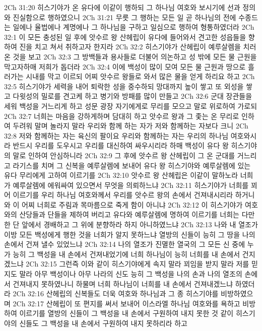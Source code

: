 2Ch 31:20  히스기야가 온 유다에 이같이 행하되 그 하나님 여호와 보시기에 선과 정의와 진실함으로 행하였으니
2Ch 31:21  무릇 그 행하는 모든 일 곧 하나님의 전에 수종드는 일에나 율법에나 계명에나 그 하나님을 구하고 일심으로 행하여 형통하였더라
2Ch 32:1  이 모든 충성된 일 후에 앗수르 왕 산헤립이 유다에 들어와서 견고한 성읍들을 향하여 진을 치고 쳐서 취하고자 한지라
2Ch 32:2  히스기야가 산헤립이 예루살렘을 치러 온 것을 보고
2Ch 32:3  그 방백들과 용사들로 더불어 의논하고 성 밖에 모든 물 근원을 막고자하매 저희가 돕더라
2Ch 32:4  이에 백성이 많이 모여 모든 물 근원과 땅으로 흘러가는 시내를 막고 이르되 어찌 앗수르 왕들로 와서 많은 물을 얻게 하리요 하고
2Ch 32:5  히스기야가 세력을 내어 퇴락한 성을 중수하되 망대까지 높이 쌓고 또 외성을 쌓고 다윗성의 밀로를 견고케 하고 병기와 방패를 많이 만들고
2Ch 32:6  군대 장관들을 세워 백성을 거느리게 하고 성문 광장 자기에게로 무리를 모으고 말로 위로하여 가로되
2Ch 32:7  너희는 마음을 강하게하며 담대히 하고 앗수르 왕과 그 좇는 온 무리로 인하여 두려워 말며 놀라지 말라 우리와 함께 하는 자가 저와 함께하는 자보다 크니
2Ch 32:8  저와 함께하는 자는 육신의 팔이요 우리와 함께하는 자는 우리의 하나님 여호와시라 반드시 우리를 도우시고 우리를 대신하여 싸우시리라 하매 백성이 유다 왕 히스기야의 말로 인하여 안심하니라
2Ch 32:9  그 후에 앗수르 왕 산헤립이 그 온 군대를 거느리고 라기스를 치며 그 신복을 예루살렘에 보내어 유다 왕 히스기야와 예루살렘에 있는 유다 무리에게 고하여 이르기를
2Ch 32:10  앗수르 왕 산헤립은 이같이 말하노라 너희가 예루살렘에 에워싸여 있으면서 무엇을 의뢰하느냐
2Ch 32:11  히스기야가 너희를 꾀어 이르기를 우리 하나님 여호와께서 우리를 앗수르 왕의 손에서 건져내시리라 하거니와 이 어찌 너희로 주림과 목마름으로 죽게 함이 아니냐
2Ch 32:12  이 히스기야가 여호와의 산당들과 단들을 제하여 버리고 유다와 예루살렘에 명하여 이르기를 너희는 다만 한 단 앞에서 경배하고 그 위에 분향하라 하지 아니하였느냐
2Ch 32:13  나와 내 열조가 이방 모든 백성에게 행한 것을 너희가 알지 못하느냐 열방의 신들이 능히 그 땅을 나의 손에서 건져 낼수 있었느냐
2Ch 32:14  나의 열조가 진멸한 열국의 그 모든 신 중에 누가 능히 그 백성을 내 손에서 건져내었기에 너희 하나님이 능히 너희를 내 손에서 건지겠느냐
2Ch 32:15  그런즉 이와 같이 히스기야에게 속지 말라 꾀임을 받지 말라 저를 믿지도 말라 아무 백성이나 아무 나라의 신도 능히 그 백성을 나의 손과 나의 열조의 손에서 건져내지 못하였나니 하물며 너희 하나님이 너희를 내 손에서 건져내겠느냐 하였더라
2Ch 32:16  산헤립의 신복들도 더욱 여호와 하나님과 그 종 히스기야를 비방하였으며
2Ch 32:17  산헤립이 또 편지를 써서 보내어 이스라엘 하나님 여호와를 욕하고 비방하여 이르기를 열방의 신들이 그 백성을 내 손에서 구원하여 내지 못한 것 같이 히스기야의 신들도 그 백성을 내 손에서 구원하여 내지 못하리라 하고
